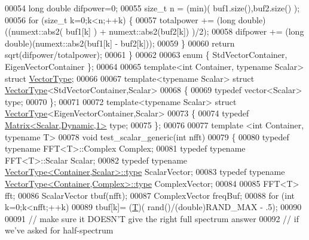 \begin{DoxyCode}
00054         \textcolor{keywordtype}{long} \textcolor{keywordtype}{double} difpower=0;
00055         \textcolor{keywordtype}{size\_t} n = (min)( buf1.size(),buf2.size() );
00056         \textcolor{keywordflow}{for} (\textcolor{keywordtype}{size\_t} k=0;k<n;++k) \{
00057             totalpower += (\textcolor{keywordtype}{long} double)((numext::abs2( buf1[k] ) + numext::abs2(buf2[k]) )/2);
00058             difpower += (\textcolor{keywordtype}{long} double)(numext::abs2(buf1[k] - buf2[k]));
00059         \}
00060         \textcolor{keywordflow}{return} sqrt(difpower/totalpower);
00061     \}
00062 
00063 \textcolor{keyword}{enum} \{ StdVectorContainer, EigenVectorContainer \};
00064 
00065 \textcolor{keyword}{template}<\textcolor{keywordtype}{int} Container, \textcolor{keyword}{typename} Scalar> \textcolor{keyword}{struct }\hyperlink{struct_vector_type}{VectorType};
00066 
00067 \textcolor{keyword}{template}<\textcolor{keyword}{typename} Scalar> \textcolor{keyword}{struct }\hyperlink{struct_vector_type}{VectorType}<StdVectorContainer,Scalar>
00068 \{
00069   \textcolor{keyword}{typedef} vector<Scalar> type;
00070 \};
00071 
00072 \textcolor{keyword}{template}<\textcolor{keyword}{typename} Scalar> \textcolor{keyword}{struct }\hyperlink{struct_vector_type}{VectorType}<EigenVectorContainer,Scalar>
00073 \{
00074   \textcolor{keyword}{typedef} \hyperlink{group___core___module}{Matrix<Scalar,Dynamic,1>} type;
00075 \};
00076 
00077 \textcolor{keyword}{template} <\textcolor{keywordtype}{int} Container, \textcolor{keyword}{typename} T>
00078 \textcolor{keywordtype}{void} test\_scalar\_generic(\textcolor{keywordtype}{int} nfft)
00079 \{
00080     \textcolor{keyword}{typedef} \textcolor{keyword}{typename} FFT<T>::Complex Complex;
00081     \textcolor{keyword}{typedef} \textcolor{keyword}{typename} FFT<T>::Scalar Scalar;
00082     \textcolor{keyword}{typedef} \textcolor{keyword}{typename} \hyperlink{struct_vector_type}{VectorType<Container,Scalar>::type} ScalarVector;
00083     \textcolor{keyword}{typedef} \textcolor{keyword}{typename} \hyperlink{struct_vector_type}{VectorType<Container,Complex>::type} ComplexVector;
00084 
00085     FFT<T> fft;
00086     ScalarVector tbuf(nfft);
00087     ComplexVector freqBuf;
00088     \textcolor{keywordflow}{for} (\textcolor{keywordtype}{int} k=0;k<nfft;++k)
00089         tbuf[k]= (\hyperlink{group___sparse_core___module_class_eigen_1_1_triplet}{T})( rand()/(double)RAND\_MAX - .5);
00090 
00091     \textcolor{comment}{// make sure it DOESN'T give the right full spectrum answer}
00092     \textcolor{comment}{// if we've asked for half-spectrum}

\end{DoxyCode}
